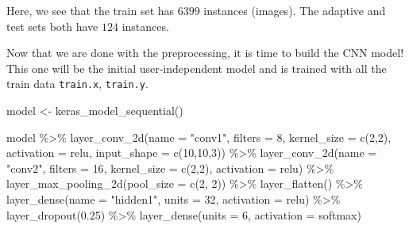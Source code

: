 \documentclass[
  11pt,
]{krantz}
\newenvironment{Shaded}{\begin{snugshade}}{\end{snugshade}}
\newcommand{\AttributeTok}[1]{\textcolor[rgb]{0.61,0.61,0.61}{#1}}
\newcommand{\DecValTok}[1]{\textcolor[rgb]{0.06,0.06,0.06}{#1}}
\newcommand{\FloatTok}[1]{\textcolor[rgb]{0.06,0.06,0.06}{#1}}
\newcommand{\FunctionTok}[1]{\textcolor[rgb]{0,0,0}{#1}}
\newcommand{\NormalTok}[1]{#1}
\newcommand{\OtherTok}[1]{\textcolor[rgb]{0.37,0.37,0.37}{#1}}
\newcommand{\SpecialCharTok}[1]{\textcolor[rgb]{0,0,0}{#1}}
\newcommand{\StringTok}[1]{\textcolor[rgb]{0.5,0.5,0.5}{#1}}
\begin{document}
Here, we see that the train set has \(6399\) instances (images). The adaptive and test sets both have \(124\) instances.

Now that we are done with the preprocessing, it is time to build the CNN model! This one will be the initial user-independent model and is trained with all the train data \texttt{train.x}, \texttt{train.y}.

\begin{Shaded}
\begin{Highlighting}[]
\NormalTok{model }\OtherTok{\textless{}{-}} \FunctionTok{keras\_model\_sequential}\NormalTok{()}

\NormalTok{model }\SpecialCharTok{\%\textgreater{}\%}
  \FunctionTok{layer\_conv\_2d}\NormalTok{(}\AttributeTok{name =} \StringTok{"conv1"}\NormalTok{,}
                \AttributeTok{filters =} \DecValTok{8}\NormalTok{,}
                \AttributeTok{kernel\_size =} \FunctionTok{c}\NormalTok{(}\DecValTok{2}\NormalTok{,}\DecValTok{2}\NormalTok{),}
                \AttributeTok{activation =} \StringTok{\textquotesingle{}relu\textquotesingle{}}\NormalTok{,}
                \AttributeTok{input\_shape =} \FunctionTok{c}\NormalTok{(}\DecValTok{10}\NormalTok{,}\DecValTok{10}\NormalTok{,}\DecValTok{3}\NormalTok{)) }\SpecialCharTok{\%\textgreater{}\%}
  \FunctionTok{layer\_conv\_2d}\NormalTok{(}\AttributeTok{name =} \StringTok{"conv2"}\NormalTok{,}
                \AttributeTok{filters =} \DecValTok{16}\NormalTok{,}
                \AttributeTok{kernel\_size =} \FunctionTok{c}\NormalTok{(}\DecValTok{2}\NormalTok{,}\DecValTok{2}\NormalTok{),}
                \AttributeTok{activation =} \StringTok{\textquotesingle{}relu\textquotesingle{}}\NormalTok{) }\SpecialCharTok{\%\textgreater{}\%}
  \FunctionTok{layer\_max\_pooling\_2d}\NormalTok{(}\AttributeTok{pool\_size =} \FunctionTok{c}\NormalTok{(}\DecValTok{2}\NormalTok{, }\DecValTok{2}\NormalTok{)) }\SpecialCharTok{\%\textgreater{}\%}
  \FunctionTok{layer\_flatten}\NormalTok{() }\SpecialCharTok{\%\textgreater{}\%}
  \FunctionTok{layer\_dense}\NormalTok{(}\AttributeTok{name =} \StringTok{"hidden1"}\NormalTok{, }\AttributeTok{units =} \DecValTok{32}\NormalTok{,}
              \AttributeTok{activation =} \StringTok{\textquotesingle{}relu\textquotesingle{}}\NormalTok{) }\SpecialCharTok{\%\textgreater{}\%}
  \FunctionTok{layer\_dropout}\NormalTok{(}\FloatTok{0.25}\NormalTok{) }\SpecialCharTok{\%\textgreater{}\%}
  \FunctionTok{layer\_dense}\NormalTok{(}\AttributeTok{units =} \DecValTok{6}\NormalTok{, }\AttributeTok{activation =} \StringTok{\textquotesingle{}softmax\textquotesingle{}}\NormalTok{)}
\end{Highlighting}
\end{Shaded}
\end{document}
